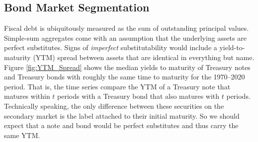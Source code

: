 \documentclass[11pt,a4paper,margin=1.5in]{article}
\begin{document}

\subsection{Bond Market Segmentation}
\label{subsec:MktSeg}
Fiscal debt is ubiquitously measured as the sum of outstanding principal values.
Simple-sum aggregates come with an assumption that the underlying assets are perfect substitutes. 
Signs of {\em imperfect} substitutability would include a yield-to-maturity (YTM) spread between assets that are identical in everything but name.
Figure \ref{fig:YTM_Spread} shows the median yields to maturity of Treasury notes and Treasury bonds with roughly the same time to maturity for the 1970--2020 period.
That is, the time series compare the YTM of a Treasury note that matures within $t$ periods with a Treasury bond that also matures with $t$ periods.
Technically speaking, the only difference between these securities on the secondary market is the label attached to their initial maturity.
So we should expect that a note and bond would be perfect substitutes and thus carry the same YTM.
\end{document}
